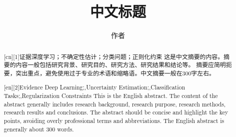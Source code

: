 \documentclass{nefuthesis}
\title{中文标题}{English Title}
\author{作者}{Author}
\begin{document}
\makecover

\begin{abstract}[cn][1]{证据深度学习；不确定性估计；分类问题；正则化约束}
这是中文摘要的内容。摘要的内容一般包括研究背景、研究目的、研究方法、研究结果和结论等。
摘要应简明扼要，突出重点，避免使用过于专业的术语和缩略语。中文摘要一般在300字左右。
\end{abstract}

\begin{abstract}[en][2]{Evidence Deep Learning;\sep Uncertainty Estimation;\sep Classification Tasks;\sep Regularization Constraints}
This is the English abstract. The content of the abstract generally includes research background,
research purpose, research methods, research results and conclusions. The abstract should be concise
and highlight the key points, avoiding overly professional terms and abbreviations. The English abstract
is generally about 300 words.
\end{abstract}

\content
\end{document}
